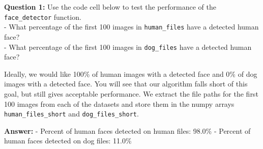 \documentclass[11pt]{article}
\begin{document}
\textbf{Question 1:} Use the code cell below to test the performance of
the \texttt{face\_detector} function.\\
- What percentage of the first 100 images in \texttt{human\_files} have
a detected human face?\\
- What percentage of the first 100 images in \texttt{dog\_files} have a
detected human face?

Ideally, we would like 100\% of human images with a detected face and
0\% of dog images with a detected face. You will see that our algorithm
falls short of this goal, but still gives acceptable performance. We
extract the file paths for the first 100 images from each of the
datasets and store them in the numpy arrays \texttt{human\_files\_short}
and \texttt{dog\_files\_short}.

\textbf{Answer:} - Percent of human faces detected on human files:
98.0\% - Percent of human faces detected on dog files: 11.0\%
\end{document}
